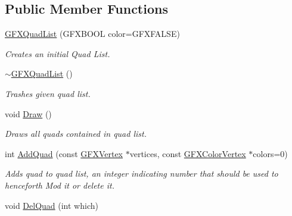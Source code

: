 \subsection*{Public Member Functions}
\begin{DoxyCompactItemize}
\item 
\hyperlink{classGFXQuadList_a7517009764979d63a89cdbe101f69477}{G\+F\+X\+Quad\+List} (G\+F\+X\+B\+O\+OL color=G\+F\+X\+F\+A\+L\+SE)\hypertarget{classGFXQuadList_a7517009764979d63a89cdbe101f69477}{}\label{classGFXQuadList_a7517009764979d63a89cdbe101f69477}

\begin{DoxyCompactList}\small\item\em Creates an initial Quad List. \end{DoxyCompactList}\item 
\hyperlink{classGFXQuadList_adb9be24cf6657dd1da29f7b404a34a37}{$\sim$\+G\+F\+X\+Quad\+List} ()\hypertarget{classGFXQuadList_adb9be24cf6657dd1da29f7b404a34a37}{}\label{classGFXQuadList_adb9be24cf6657dd1da29f7b404a34a37}

\begin{DoxyCompactList}\small\item\em Trashes given quad list. \end{DoxyCompactList}\item 
void \hyperlink{classGFXQuadList_a814cc54debab7ac7d2b2e05bfbb1331a}{Draw} ()\hypertarget{classGFXQuadList_a814cc54debab7ac7d2b2e05bfbb1331a}{}\label{classGFXQuadList_a814cc54debab7ac7d2b2e05bfbb1331a}

\begin{DoxyCompactList}\small\item\em Draws all quads contained in quad list. \end{DoxyCompactList}\item 
int \hyperlink{classGFXQuadList_a4234039736ab549085f2697f48d9f7f7}{Add\+Quad} (const \hyperlink{structGFXVertex}{G\+F\+X\+Vertex} $\ast$vertices, const \hyperlink{structGFXColorVertex}{G\+F\+X\+Color\+Vertex} $\ast$colors=0)\hypertarget{classGFXQuadList_a4234039736ab549085f2697f48d9f7f7}{}\label{classGFXQuadList_a4234039736ab549085f2697f48d9f7f7}

\begin{DoxyCompactList}\small\item\em Adds quad to quad list, an integer indicating number that should be used to henceforth Mod it or delete it. \end{DoxyCompactList}\item 
void \hyperlink{classGFXQuadList_a1e173f5e74832aabba2db50c09036c2a}{Del\+Quad} (int which)\hypertarget{classGFXQuadList_a1e173f5e74832aabba2db50c09036c2a}{}\label{classGFXQuadList_a1e173f5e74832aabba2db50c09036c2a}


\end{DoxyCompactItemize}
